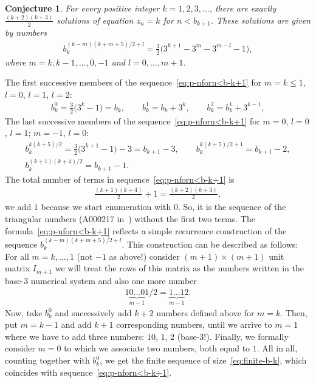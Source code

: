 \documentclass[pdftex]{sigma}
\numberwithin{equation}{section}
\newtheorem{Conjecture}[Theorem]{Conjecture}
\begin{document}
\begin{Conjecture}\label{con:b-k-k+1}
For every positive integer $k=1,2,3,\ldots$, there are exactly $\frac{(k+2)(k+3)}2$ solutions of equation $z_n=k$ for $n<b_{k+1}$.
These solutions are given by numbers
\begin{gather}\label{eq:p-nforn<b-k+1}
b_k^{(k-m)(k+m+5)/2+l}=\frac32\big(3^{k+1}-3^{m}-3^{m-l}-1\big),
\end{gather}
where $m=k,k-1,\ldots,0,-1$ and $l=0,\ldots,m+1$.
\end{Conjecture}
The first successive members of the sequence~\eqref{eq:p-nforn<b-k+1} for $m=k\leq1$, $l=0$, $l=1$, $l=2$:
\begin{gather*}
b_k^0=\frac32\big(3^k-1\big)=b_k,\qquad
b_k^1=b_k+3^k,\qquad
b_k^2=b_k^1+3^{k-1},
\end{gather*}
The last successive members of the sequence~\eqref{eq:p-nforn<b-k+1} for $m=0$, $l=0$, $l=1$; $m=-1$, $l=0$:
\begin{gather*}
b_k^{k(k+5)/2}=\frac32\big(3^{k+1}-1\big)-3=b_{k+1}-3,\qquad
b_k^{k(k+5)/2+1}=b_{k+1}-2,\\
b_k^{(k+1)(k+4)/2}=b_{k+1}-1.
\end{gather*}
The total number of terms in sequence~\eqref{eq:p-nforn<b-k+1} is
\begin{gather}\label{eq:finite-b-k}
\frac{(k+1)(k+4)}{2}+1=\frac{(k+2)(k+3)}{2},
\end{gather}
we add $1$ because we start enumeration with $0$. So, it is the sequence of the triangular numbers (A000217 in~\cite{OEIS})
without the first two terms.
The formula~\eqref{eq:p-nforn<b-k+1} reflects a simple recurrence construction of the sequence $b_k^{(k-m)(k+m+5)/2+l}$.
This construction can be described as follows: For all $m=k,\ldots, 1$ (not $-1$ as above!) consider $(m+1)\times(m+1)$
unit matrix $I_{m+1}$ we will treat the rows of this matrix as the numbers written in the base-3 numerical system and also
one more number
\begin{gather*}
1\underset{m-1}{\underbrace{0\ldots0}}1/2=\underset{m-1}{\underbrace{1\ldots1}}2.
\end{gather*}
Now, take $b_k^0$ and successively add $k+2$ numbers defined above for $m=k$. Then, put $m=k-1$ and add $k+1$ corresponding
numbers, until we arrive to $m=1$ where we have to add three numbers: $10$, $1$, $2$ (base-3!). Finally, we formally consider $m=0$ to which
we associate two numbers, both equal to $1$. All in all, counting together with $b_k^0$, we get the finite sequence of
size~\eqref{eq:finite-b-k}, which coincides with sequence~\eqref{eq:p-nforn<b-k+1}.
\end{document}
